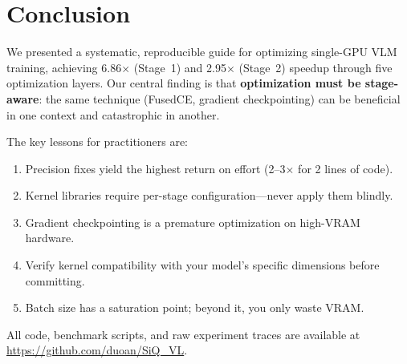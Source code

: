 \documentclass[11pt,a4paper]{article}
\begin{document}
\section{Conclusion}
\label{sec:conclusion}

We presented a systematic, reproducible guide for optimizing single-GPU VLM training,
achieving 6.86$\times$ (Stage~1) and 2.95$\times$ (Stage~2) speedup through five
optimization layers. Our central finding is that \textbf{optimization must be
stage-aware}: the same technique (FusedCE, gradient checkpointing) can be beneficial
in one context and catastrophic in another.

The key lessons for practitioners are:
\begin{enumerate}[leftmargin=*,nosep]
\item Precision fixes yield the highest return on effort (2--3$\times$ for 2 lines of code).
\item Kernel libraries require per-stage configuration---never apply them blindly.
\item Gradient checkpointing is a premature optimization on high-VRAM hardware.
\item Verify kernel compatibility with your model's specific dimensions before committing.
\item Batch size has a saturation point; beyond it, you only waste VRAM.
\end{enumerate}

All code, benchmark scripts, and raw experiment traces are available at
\url{https://github.com/duoan/SiQ_VL}.
\end{document}
